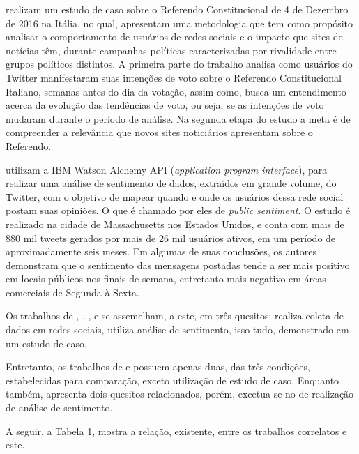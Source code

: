 \cite{MarozzoeBessi:18} realizam um estudo de caso sobre o Referendo Constitucional de 4 de Dezembro de 2016 na Itália, no qual, apresentam uma metodologia que tem como propósito analisar o comportamento de usuários de redes sociais e o impacto que sites de notícias têm, durante campanhas políticas caracterizadas por rivalidade entre grupos políticos distintos.
A primeira parte do trabalho analisa como usuários do Twitter manifestaram suas intenções de voto sobre o Referendo Constitucional Italiano, semanas antes do dia da votação, assim como, busca um entendimento acerca da evolução das tendências de voto, ou seja, se as intenções de voto mudaram durante o período de análise.
Na segunda etapa do estudo a meta é de compreender a relevância que novos sites noticiários apresentam sobre o Referendo.

\cite{CaoEtAl:18} utilizam a IBM Watson Alchemy API (\textit{application program interface}), para realizar uma análise de sentimento de dados, extraídos em grande volume, do Twitter, com o objetivo de mapear quando e onde os usuários dessa rede social postam suas opiniões. O que é chamado por eles de \textit{public sentiment}.
O estudo é realizado na cidade de Massachusetts nos Estados Unidos, e conta com mais de 880 mil tweets gerados por mais de 26 mil usuários ativos, em um período de aproximadamente seis meses.
Em algumas de suas conclusões, os autores demonstram que o sentimento das mensagens postadas tende a ser mais positivo em locais públicos nos finais de semana, entretanto mais negativo em áreas comerciais de Segunda à Sexta.

Os trabalhos de \cite{Farzindar:15}, \cite{Rosa:15}, \cite{GaoEtAl:17}, \cite{MarozzoeBessi:18} e \cite{CaoEtAl:18} se assemelham, a este, em três quesitos: realiza coleta de dados em redes sociais, utiliza análise de sentimento, isso tudo, demonstrado em um estudo de caso.

Entretanto, os trabalhos de \cite{ThakoreSasi:15} e \cite{Weiand:16} possuem apenas duas, das três condições, estabelecidas para comparação, exceto utilização de estudo de caso. Enquanto \cite{GaoEtAlInfluenza:18} também, apresenta dois quesitos relacionados, porém, excetua-se no de realização de análise de sentimento.

A seguir, a Tabela 1, mostra a relação, existente, entre os trabalhos correlatos e este.


